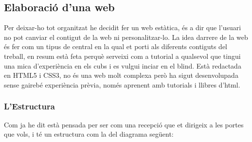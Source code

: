 \subsection{Elaboració d'una web}

Per deixar-ho tot organitzat he decidit fer un web estàtica, és a dir que l'usuari no pot canviar el contigut de la web ni personalitzar-lo. La idea darrere de la web és fer com un tipus de central en la qual et porti als diferents contiguts del treball, en resum està feta perquè serveixi com a tutorial a qualsevol que tingui una mica d'experiència en els cubs i es vulgui inciar en el blind.
Està redactada en HTML5 i CSS3, no és una web molt complexa però ha sigut desenvolupada sense gairebé experiència prèvia, només aprenent amb tutorials i llibres d'html.
\subsubsection{L'Estructura}

Com ja he dit està pensada per ser com una recepció que et dirigeix a les portes que vols, i té un estructura com la del diagrama següent:





